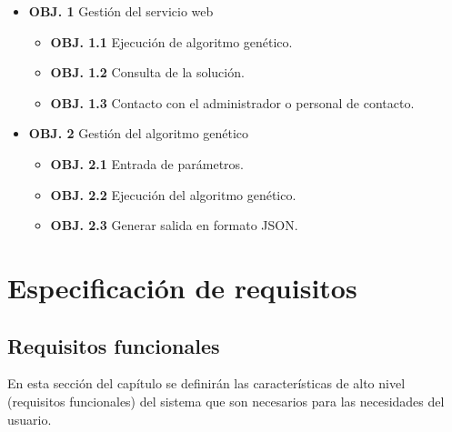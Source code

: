 \begin{itemize}
	\item  \textbf{OBJ. 1} Gestión del servicio web
	\begin{itemize}
		\item \textbf{OBJ. 1.1} Ejecución de algoritmo genético.	
		\item \textbf{OBJ. 1.2} Consulta de la solución.
		\item \textbf{OBJ. 1.3} Contacto con el administrador o personal de contacto.
	\end{itemize}
		
	\item  \textbf{OBJ. 2} Gestión del algoritmo genético
	\begin{itemize}
		\item \textbf{OBJ. 2.1} Entrada de parámetros.
		\item \textbf{OBJ. 2.2} Ejecución del algoritmo genético.
		\item \textbf{OBJ. 2.3} Generar salida en formato JSON.
	\end{itemize}
	
\end{itemize}


	 

\newpage
\section{Especificación de requisitos}

\subsection{Requisitos funcionales}

\bigskip
En esta sección del capítulo se definirán las características de alto nivel (requisitos funcionales) del sistema que son necesarios para las necesidades del usuario.

\bigskip

